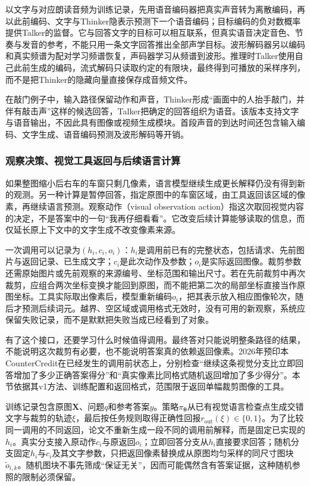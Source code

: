 以文字与对应朗读音频为训练记录，先用语音编码器把真实声音转为离散编码，再以此前编码、文字与Thinker隐表示预测下一个语音编码；目标编码的负对数概率提供Talker的监督。它与回答文字的目标可以相互联系，但真实语音决定音色、节奏与发音的参考，不能只用一条文字回答推出全部声学目标。波形解码器另以编码和真实频谱为配对学习频谱恢复，声码器学习从频谱到波形。推理时Talker使用自己此前生成的编码，流式解码只读取约定的有限块，最终得到可播放的采样序列，而不是把Thinker的隐藏向量直接保存成音频文件。

在敲门例子中，输入路径保留动作和声音，Thinker形成“画面中的人抬手敲门，并伴有敲击声”这样的候选回答，Talker把确定的回答组织为语音。该版本支持文字与语音输出，不因此具有图像或视频生成模块。首段声音的到达时间还包含输入编码、文字生成、语音编码预测及波形解码等开销。

\subsubsection{观察决策、视觉工具返回与后续语言计算}
\label{sec:vision-models-observation}
\label{sec:vision-models-countercredit}

如果整图缩小后右车的车窗只剩几像素，语言模型继续生成更长解释仍没有得到新的观测。另一种计算是暂停回答，指定原图中的车窗区域，由工具返回该区域的像素，再继续语言预测。观察动作（visual observation action）指这次取回视觉内容的决定，不是答案中的一句“我再仔细看看”。它改变后续计算能够读取的信息，而仅延长原上下文中的文字生成不改变像素来源。

一次调用可以记录为$(h_i,c_i,o_i)$：$h_i$是调用前已有的完整状态，包括请求、先前图片与返回记录、已生成文字；$c_i$是此次动作及参数；$o_i$是实际返回图像。裁剪参数还需原始图片或先前观察的来源编号、坐标范围和输出尺寸。若在先前裁剪中再次裁剪，应组合两次坐标变换才能回到原图，而不能把第二次的局部坐标直接当作原图坐标。工具实际取出像素后，模型重新编码$o_i$，把其表示放入相应图像轮次，随后才预测后续词元。越界、空区域或调用格式无效时，没有可用的新观察，系统应保留失败记录，而不是默默把失败当成已经看到了对象。

有了这个接口，还要学习什么时候值得调用。最终答对只能说明整条路径的结果，不能说明这次裁剪有必要，也不能说明答案真的依赖返回像素。2026年预印本CounterCredit在已经发生的调用前状态上，分别检查“继续这条视觉分支比立即回答增加了多少正确答案得分”和“真实像素比同格式随机返回增加了多少得分”。本节依据其v1方法、训练配置和返回格式，范围限于返回单幅裁剪图像的工具。

训练记录包含原图$\bm X$、问题$q$和参考答案$y$。策略$\pi_{\bm\theta}$从已有视觉语言检查点生成交错文字与裁剪的轨迹$\xi$，最后按任务规则取得正确性回报$r_{\mathrm{out}}(\xi)\in\{0,1\}$。为了比较同一调用的不同返回，论文不重新生成一段不同的调用前解释，而是固定已实现的$h_i$。真实分支接入原动作$c_i$与原返回$o_i$；立即回答分支从$h_i$直接要求回答；随机分支固定$h_i$与$c_i$及其文字参数，只把返回像素替换成从原图均匀采样的同尺寸图块$\widetilde o_{i,k}$。随机图块不事先筛成“保证无关”，因而可能偶然含有答案证据，这种随机参照的限制必须保留。

